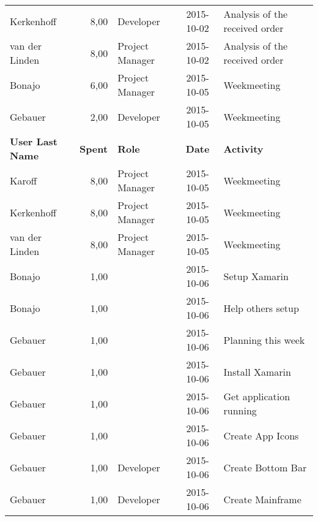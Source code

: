 \begin{longtable}{ l r p{2cm} c p{4cm}}
		Kerkenhoff              & 8,00           & Developer       & 2015-10-02    & Analysis of the received order                  \\
		van der Linden          & 8,00           & Project Manager & 2015-10-02    & Analysis of the received order                  \\
		Bonajo                  & 6,00           & Project Manager & 2015-10-05    & Weekmeeting                                     \\
		Gebauer                 & 2,00           & Developer       & 2015-10-05    & Weekmeeting                                     \\
		\textbf{User Last Name} & \textbf{Spent} & \textbf{Role} & \textbf{Date} & \textbf{Activity} \\
		\hline
		Karoff                  & 8,00           & Project Manager & 2015-10-05    & Weekmeeting                                     \\
		Kerkenhoff              & 8,00           & Project Manager & 2015-10-05    & Weekmeeting                                     \\
		van der Linden          & 8,00           & Project Manager & 2015-10-05    & Weekmeeting                                     \\
		Bonajo                  & 1,00           &                 & 2015-10-06    & Setup Xamarin                                   \\
		Bonajo                  & 1,00           &                 & 2015-10-06    & Help others setup                               \\
		Gebauer                 & 1,00           &                 & 2015-10-06    & Planning this week                              \\
		Gebauer                 & 1,00           &                 & 2015-10-06    & Install Xamarin                                 \\
		Gebauer                 & 1,00           &                 & 2015-10-06    & Get application running                         \\
		Gebauer                 & 1,00           &                 & 2015-10-06    & Create App Icons                                \\
		Gebauer                 & 1,00           & Developer       & 2015-10-06    & Create Bottom Bar                               \\
		Gebauer                 & 1,00           & Developer       & 2015-10-06    & Create Mainframe                                \\

\end{longtable}
